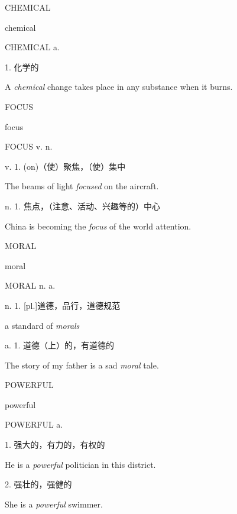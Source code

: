\begin{flashcard}{
CHEMICAL

chemical
}
\begin{center}
CHEMICAL a. 
\end{center}
1. 化学的

A \textit{chemical} change takes place in any substance when it burns.

\end{flashcard}
\begin{flashcard}{
FOCUS

focus
}
\begin{center}
FOCUS v. n. 
\end{center}
v. 1. (on)（使）聚焦，（使）集中

The beams of light \textit{focused} on the aircraft.

n. 1. 焦点，（注意、活动、兴趣等的）中心

China is becoming the \textit{focus} of the world attention.

\end{flashcard}
\begin{flashcard}{
MORAL

moral
}
\begin{center}
MORAL n. a. 
\end{center}
n. 1. [pl.]道德，品行，道德规范

a standard of \textit{morals}

a. 1. 道德（上）的，有道德的

The story of my father is a sad \textit{moral} tale.

\end{flashcard}
\begin{flashcard}{
POWERFUL

powerful
}
\begin{center}
POWERFUL a. 
\end{center}
1. 强大的，有力的，有权的

He is a \textit{powerful} politician in this district.

2. 强壮的，强健的

She is a \textit{powerful} swimmer.

\end{flashcard}
